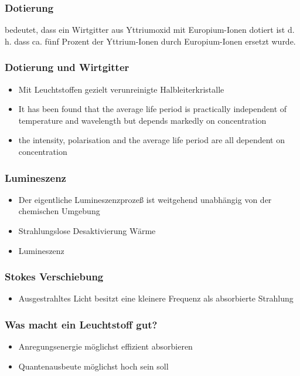 \documentclass{beamer}
\begin{document}
\begin{frame}[t]\frametitle{Dotierung}
 bedeutet, dass ein Wirtgitter aus Yttriumoxid mit Europium-Ionen dotiert ist
 d. h. dass ca. fünf Prozent der Yttrium-Ionen durch Europium-Ionen ersetzt wurde.


\end{frame}


\begin{frame}[t]\frametitle{Dotierung und Wirtgitter}
\begin{itemize}
  \item Mit Leuchtstoffen gezielt verunreinigte Halbleiterkristalle
  \item It has been found that the average life period is practically independent of temperature and wavelength but depends markedly on concentration
  \item the intensity, polarisation and the average life period are all dependent on concentration
\end{itemize}


\end{frame}

  \begin{frame}
  \frametitle{Lumineszenz}
    \begin{itemize}
    \item Der eigentliche Lumineszenzprozeß ist weitgehend unabhängig von der chemischen Umgebung
    \item Strahlungslose Desaktivierung  Wärme
    \item Lumineszenz 
    \end{itemize}
  \end{frame}

\begin{frame}
  \frametitle{Stokes Verschiebung}
    \begin{itemize}
    \item Ausgestrahltes Licht besitzt eine kleinere Frequenz als absorbierte Strahlung
    \end{itemize}
  \end{frame}


\begin{frame}[t]\frametitle{Was macht ein Leuchtstoff gut?}
\begin{itemize}
 \item Anregungsenergie möglichst effizient absorbieren
 \item Quantenausbeute möglichst hoch sein soll
\end{itemize}
\end{frame}
\end{document}
